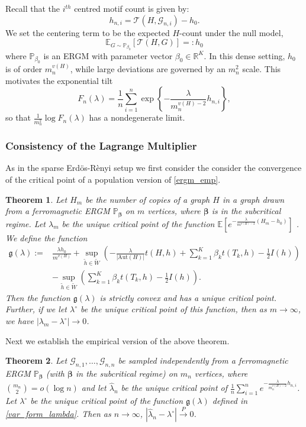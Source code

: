 \documentclass[12pt]{article}
\def\P{\mathbb{P}}
\def\E{\mathbb{E}}
\def\er{ Erd{\"o}s-R{\`e}nyi }
\def\r#1{{\color{blue}\marginnote{\textbf{R}} #1}}
\numberwithin{equation}{section}
\newtheorem{theorem}{Theorem}[section]
\def\bbeta{\boldsymbol{\beta}}
\begin{document}
Recall that the $i^{th}$ centred motif count is given by:
$$h_{n,i}=\mathcal{T}(H,\mathcal{G}_{n,i})-h_0.$$
We set the centering term to be the expected \( H \)-count under the null model,  
\[
\mathbb{E}_{G\sim\mathbb{P}_{\beta_0}}[\mathcal{T}(H,G)]=:h_0
\]
where \(\mathbb{P}_{\beta_0}\) is an ERGM with parameter vector \(\beta_0\in\mathbb{R}^K\). In this dense setting, $h_0$ is of order $m_n^{v(H)}$, while large deviations are governed by an $m_n^2$ scale. This motivates the exponential tilt
\begin{equation}
F_n(\lambda) = \frac{1}{n}\sum_{i=1}^n \exp\left\{-\frac{\lambda}{m_n^{v(H)-2}} h_{n,i}\right\},\label{ergm_emp}
\end{equation}
so that $\frac{1}{m_n^2}\log F_n(\lambda)$ has a nondegenerate limit. 

\subsubsection{Consistency of the Lagrange Multiplier}

As in the sparse \er setup we first consider the consider the convergence of the critical point of a population version of \eqref{ergm_emp}.
\begin{theorem}
\label{normal_consistency_1}
Let $H_m$ be the number of copies of a graph $H$ in a graph drawn from a ferromagnetic ERGM $\P_{\bbeta}$ on $m$ vertices, where $\bbeta$ is in the subcritical regime. Let $\lambda_m$ be the unique critical point of the function
$\E[e^{-\frac{\lambda}{m^{v(H)-2}}(H_m-h_0)}]$ . We define the function
\begin{align}
\mathfrak{g}(\lambda) := &\frac{\lambda h_0}{m^{v(H)}} + \sup_{\tilde{h}\in\tilde{W}}\left(-\frac{\lambda}{\lvert \text{Aut}(H)\rvert} t(H,h) + \sum_{k=1}^K \beta_k t(T_k, h) - \frac{1}{2}I(h) \right)\nonumber\\
&- \sup_{\tilde{h}\in\tilde{W}}\left( \sum_{k=1}^K \beta_k t(T_k, h) - \frac{1}{2}I(h) \right)\label{var_form_lambda}.
\end{align}
Then the function $\mathfrak{g}(\lambda)$ is strictly convex and has a unique critical point. Further, if we let $\lambda^{\circ}$ be the unique critical point of this function, then as $m\to\infty$, we have $|\lambda_m - \lambda^{\circ}| \to 0$.
\end{theorem}
Next we establish the empirical version of the above theorem.



\begin{theorem}{\label{normal_consistency_2}}
Let $\mathcal{G}_{n,1}, \dots, \mathcal{G}_{n,n}$ be sampled independently from a ferromagnetic ERGM $\P_{\bbeta}$ (with $\bbeta$ in the subcritical regime) on $m_n$ vertices, where $\binom{m_n}{2}=o(\log n)$ and let $\hat{\lambda}_n$ be the unique critical point of $\frac{1}{n}\sum_{i=1}^n e^{-\frac{\lambda}{m_n^{v(H)-2}} h_{n,i}}$. Let $\lambda^{\circ}$ be the unique critical point of the function $\mathfrak{g}(\lambda)$ defined in \eqref{var_form_lambda}. Then as $n\to\infty$, $|\hat{\lambda}_n - \lambda^{\circ}| \xrightarrow{P} 0$.
\end{theorem}
\end{document}
